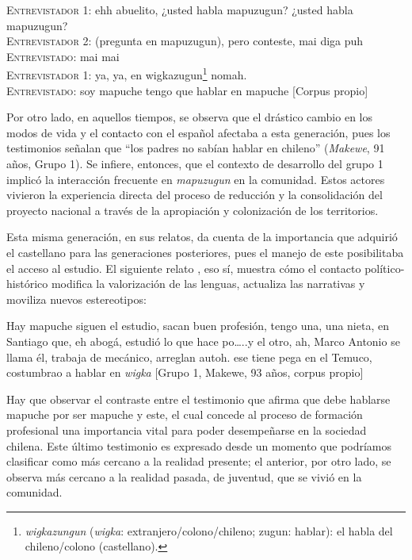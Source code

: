 \documentclass[output=paper]{../langscibook}
\begin{document}
\ea\label{ex:olate:1}
 \textsc{Entrevistador 1}: ehh abuelito, ¿usted habla mapuzugun? ¿usted habla mapuzugun?\\
 \textsc{Entrevistador 2:} (pregunta en mapuzugun), pero conteste, mai diga puh\\
 \textsc{Entrevistado:} mai mai\\
 \textsc{Entrevistador 1:} ya, ya, en wigkazugun\footnote{{\emph{wigkazungun}} ({\textit{wigka}}: extranjero/colono/chileno; {zugun}: hablar): el habla del chileno/colono (castellano).}  nomah.\\
 \textsc{Entrevistado:} soy mapuche tengo que hablar en mapuche \textup{[Corpus propio]}\\
 \z

Por otro lado, en aquellos tiempos, se observa que el drástico cambio en los modos de vida y el contacto con el español afectaba a esta generación, pues los testimonios señalan que “los padres no sabían hablar en chileno” (\textit{Makewe}, 91 años, Grupo 1). Se infiere, entonces, que el contexto de desarrollo del grupo 1 implicó la interacción frecuente en \textit{mapuzugun} en la comunidad. Estos actores vivieron la experiencia directa del proceso de reducción y la consolidación del proyecto nacional a través de la apropiación y colonización de los territorios.

Esta misma generación, en sus relatos, da cuenta de la importancia que adquirió el castellano para las generaciones posteriores, pues el manejo de este posibilitaba el acceso al estudio. El siguiente relato , eso sí, muestra cómo el contacto político-histórico modifica la valorización de las lenguas, actualiza las narrativas y moviliza nuevos estereotipos:

\ea\label{ex:olate:2}
 Hay mapuche siguen el estudio, sacan buen profesión, tengo una, una nieta, en Santiago que, eh abogá, estudió lo que hace po…..y el otro, ah, Marco Antonio se llama él, trabaja de mecánico, arreglan autoh. ese tiene pega en el Temuco, costumbrao a hablar en \textit{wigka} \textup{[Grupo 1, Makewe, 93 años, corpus propio]}\\
\z

Hay que observar el contraste entre el testimonio que afirma que debe hablarse mapuche por ser mapuche y este, el cual concede al proceso de formación profesional una importancia vital para poder desempeñarse en la sociedad chilena. Este último testimonio es expresado desde un momento que podríamos clasificar como más cercano a la realidad presente; el anterior, por otro lado, se observa más cercano a la realidad pasada, de juventud, que se vivió en la comunidad. 
\end{document}
